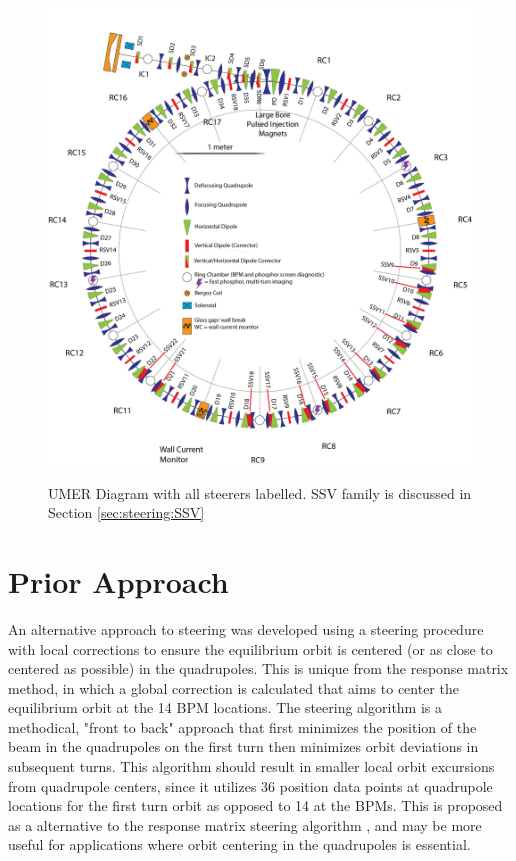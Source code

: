 \begin{figure}
\begin{center}
\includegraphics[width=\textwidth]{6.figures/full_ring_steerers_labelled.png}
\end{center}
\renewcommand{\baselinestretch}{1}
\small\normalsize
\begin{quote}
\caption[]{UMER Diagram with all steerers labelled. SSV family is discussed in Section \ref{sec:steering:SSV}}
\label{fig:steerers-labelled}
\end{quote}
\end{figure} 
\renewcommand{\baselinestretch}{2}
\small\normalsize



\section{Prior Approach}




An alternative approach to steering was developed using a steering procedure with local corrections to ensure the equilibrium orbit is centered (or as close to centered as possible) in the quadrupoles. This is unique from the response matrix method, in which a global correction is calculated that aims to center the equilibrium orbit at the 14 BPM locations. The steering algorithm is a methodical, "front to back" approach that first minimizes the position of the beam in the quadrupoles on the first turn then minimizes orbit deviations in subsequent turns. This algorithm should result in smaller local orbit excursions from quadrupole centers, since it utilizes 36 position data points at quadrupole locations for the first turn orbit as opposed to 14 at the BPMs.
This is proposed as a alternative to the response matrix steering algorithm \cite{KPRnote:2011}, and may be more useful for applications where orbit centering in the quadrupoles is essential.

